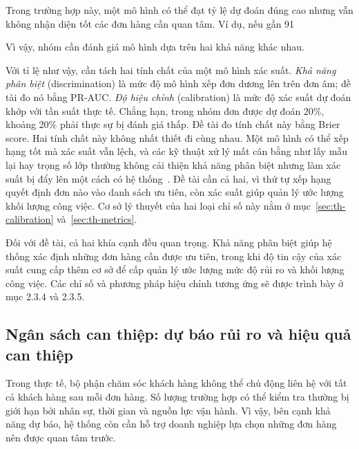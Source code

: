 \documentclass[12pt,a4paper]{report}
\begin{document}
Trong trường hợp này, một mô hình có thể đạt tỷ lệ dự đoán đúng cao nhưng vẫn không nhận diện tốt các đơn hàng cần quan tâm. Ví dụ, nếu gần 91%

Vì vậy, nhóm cần đánh giá mô hình dựa trên hai khả năng khác nhau.

Với tỉ lệ như vậy, cần tách hai tính chất của một mô hình xác suất. \emph{Khả năng phân biệt} (discrimination) là mức độ mô hình xếp đơn dương lên trên đơn âm; đề tài đo nó bằng PR-AUC. \emph{Độ hiệu chỉnh} (calibration) là mức độ xác suất dự đoán khớp với tần suất thực tế. Chẳng hạn, trong nhóm đơn được dự đoán 20\%, khoảng 20\% phải thực sự bị đánh giá thấp. Đề tài đo tính chất này bằng Brier score. Hai tính chất này không nhất thiết đi cùng nhau. Một mô hình có thể xếp hạng tốt mà xác suất vẫn lệch, và các kỹ thuật xử lý mất cân bằng như lấy mẫu lại hay trọng số lớp thường không cải thiện khả năng phân biệt nhưng làm xác suất bị đẩy lên một cách có hệ thống~\parencite{vandengoorbergh2022}. Đề tài cần cả hai, vì thứ tự xếp hạng quyết định đơn nào vào danh sách ưu tiên, còn xác suất giúp quản lý ước lượng khối lượng công việc. Cơ sở lý thuyết của hai loại chỉ số này nằm ở mục~\ref{sec:th-calibration} và~\ref{sec:th-metrics}.

Đối với đề tài, cả hai khía cạnh đều quan trọng. Khả năng phân biệt giúp hệ thống xác định những đơn hàng cần được ưu tiên, trong khi độ tin cậy của xác suất cung cấp thêm cơ sở để cấp quản lý ước lượng mức độ rủi ro và khối lượng công việc. Các chỉ số và phương pháp hiệu chỉnh tương ứng sẽ được trình bày ở mục 2.3.4 và 2.3.5.

\subsection{Ngân sách can thiệp: dự báo rủi ro và hiệu quả can thiệp}\label{sec:con-budget}

Trong thực tế, bộ phận chăm sóc khách hàng không thể chủ động liên hệ với tất cả khách hàng sau mỗi đơn hàng. Số lượng trường hợp có thể kiểm tra thường bị giới hạn bởi nhân sự, thời gian và nguồn lực vận hành. Vì vậy, bên cạnh khả năng dự báo, hệ thống còn cần hỗ trợ doanh nghiệp lựa chọn những đơn hàng nên được quan tâm trước.
\end{document}

